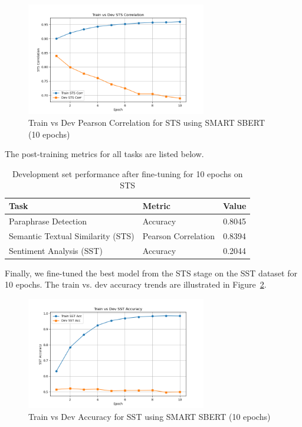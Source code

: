 \begin{figure}[H]
    \centering
    \includegraphics[width=0.7\textwidth]{Figures/SS_sts_corr.png}
    \caption{Train vs Dev Pearson Correlation for STS using SMART SBERT (10 epochs)}
    \label{fig:SS_sts_corr}
\end{figure}

The post-training metrics for all tasks are listed below.

\begin{table}[H]
    \centering
    \begin{tabular}{|l|l|c|}
    \hline
    \textbf{Task} & \textbf{Metric} & \textbf{Value} \\ \hline
    Paraphrase Detection & Accuracy & 0.8045 \\ \hline
    Semantic Textual Similarity (STS) & Pearson Correlation & 0.8394 \\ \hline
    Sentiment Analysis (SST) & Accuracy & 0.2044 \\ \hline
    \end{tabular}
    \caption{Development set performance after fine-tuning for 10 epochs on STS}
    \label{tab:post_finetuning_metrics_SS2}
\end{table}

Finally, we fine-tuned the best model from the STS stage on the SST dataset for 10 epochs. The train vs. dev accuracy trends are illustrated in Figure~\ref{fig:SS_sst_acc}.

\begin{figure}[H]
    \centering
    \includegraphics[width=0.7\textwidth]{Figures/SS_sst_acc.png}
    \caption{Train vs Dev Accuracy for SST using SMART SBERT (10 epochs)}
    \label{fig:SS_sst_acc}
\end{figure}

